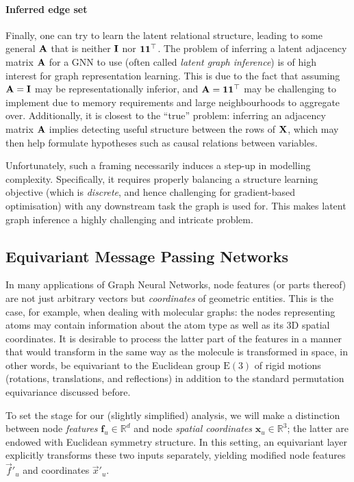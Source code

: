 \paragraph*{Inferred edge set}

Finally, one can try to learn the latent relational structure, leading to some general ${\bf A}$ that is neither ${\bf I}$ nor ${\bf 1}{\bf 1}^\top$. The problem of inferring a latent adjacency matrix ${\bf A}$ for a GNN to use (often called \emph{latent graph inference}) is of high interest for graph representation learning. This is due to the fact that assuming ${\bf A} = {\bf I}$ may be representationally inferior, and ${\bf A} = {\bf 1}{\bf 1}^\top$ may be challenging to implement due to memory requirements and large neighbourhoods to aggregate over. Additionally, it is closest to the ``true'' problem: inferring an adjacency matrix ${\bf A}$ implies detecting useful structure between the rows of ${\bf X}$, which may then help formulate hypotheses such as causal relations between variables.

Unfortunately, such a framing necessarily induces a step-up in modelling complexity. Specifically, it requires properly balancing a structure learning objective (which is \emph{discrete}, and hence challenging for gradient-based optimisation) with any downstream task the graph is used for. This makes latent graph inference a highly challenging and intricate problem. %

\subsection{Equivariant Message Passing Networks}

In many applications of Graph Neural Networks, node features (or parts thereof) are not just arbitrary vectors but \emph{coordinates} of geometric entities. This is the case, for example, when dealing with molecular graphs: the nodes representing atoms may contain information about the atom type as well as its 3D spatial coordinates. It is desirable to process the latter part of the features in a manner that would transform in the same way as the molecule is transformed in space, in other words, be equivariant to the Euclidean group $\mathrm{E}(3)$ of rigid motions (rotations, translations, and reflections) in addition to the standard permutation equivariance discussed before. 

To set the stage for our (slightly simplified) analysis, we will make a distinction between node {\em features} $\mathbf{f}_u \in \mathbb{R}^d$ and node {\em spatial coordinates} $\mathbf{x}_u\in \mathbb{R}^3$; the latter are endowed with Euclidean symmetry structure. In this setting, an equivariant layer explicitly transforms these two inputs separately, yielding modified node features $\vec{f}'_u$ and coordinates $\vec{x}'_u$.

